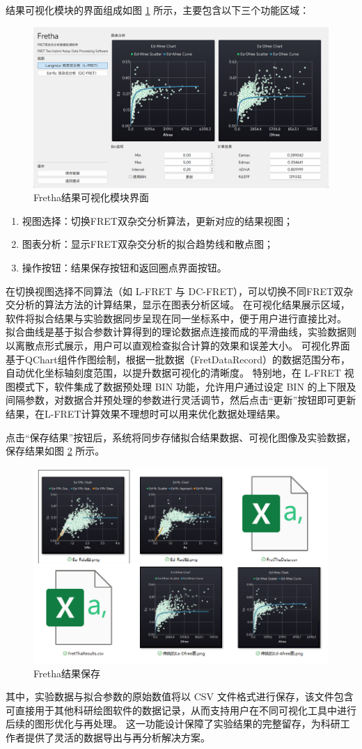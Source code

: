 结果可视化模块的界面组成如图 \ref{fig:fretha_result_ui} 所示，主要包含以下三个功能区域：
\begin{figure}
  \centering
  \includegraphics[width=0.9\linewidth]{../figures/2/2_结果可视化.png}
  \caption{Fretha结果可视化模块界面}
  \label{fig:fretha_result_ui}
\end{figure}

\begin{enumerate}
  \item 视图选择：切换FRET双杂交分析算法，更新对应的结果视图；
  \item 图表分析：显示FRET双杂交分析的拟合趋势线和散点图；
  \item 操作按钮：结果保存按钮和返回圈点界面按钮。
\end{enumerate}

在切换视图选择不同算法（如 L-FRET 与 DC-FRET），可以切换不同FRET双杂交分析的算法方法的计算结果，显示在图表分析区域。
在可视化结果展示区域，软件将拟合结果与实验数据同步呈现在同一坐标系中，便于用户进行直接比对。
拟合曲线是基于拟合参数计算得到的理论数据点连接而成的平滑曲线，实验数据则以离散点形式展示，用户可以直观检查拟合计算的效果和误差大小。
可视化界面基于QChart组件作图绘制，根据一批数据（FretDataRecord）的数据范围分布，自动优化坐标轴刻度范围，以提升数据可视化的清晰度。
特别地，在 L-FRET 视图模式下，软件集成了数据预处理 BIN 功能，允许用户通过设定 BIN 的上下限及间隔参数，对数据合并预处理的参数进行灵活调节，然后点击“更新”按钮即可更新结果，在L-FRET计算效果不理想时可以用来优化数据处理结果。

点击“保存结果”按钮后，系统将同步存储拟合结果数据、可视化图像及实验数据，保存结果如图 \ref{fig:结果保存} 所示。
\begin{figure}
  \centering
  \includegraphics[width=0.6\linewidth]{../figures/2/2_保存数据.png}
  \caption{Fretha结果保存}
  \label{fig:结果保存}
\end{figure}
其中，实验数据与拟合参数的原始数值将以 CSV 文件格式进行保存，该文件包含可直接用于其他科研绘图软件的数据记录，从而支持用户在不同可视化工具中进行后续的图形优化与再处理。
这一功能设计保障了实验结果的完整留存，为科研工作者提供了灵活的数据导出与再分析解决方案。
\fi

